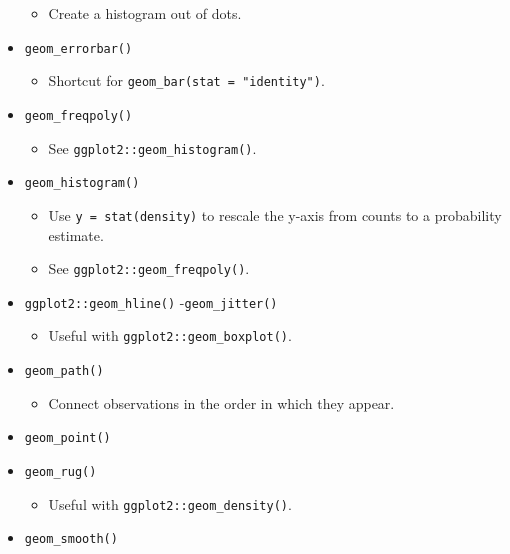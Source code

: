 \documentclass[
]{book}
\providecommand{\tightlist}{%
  \setlength{\itemsep}{0pt}\setlength{\parskip}{0pt}}
\begin{document}
\begin{itemize}
  \begin{itemize}
  \tightlist
  \item
    Create a histogram out of dots.
  \end{itemize}
\item
  \texttt{geom\_errorbar()}

  \begin{itemize}
  \tightlist
  \item
    Shortcut for \texttt{geom\_bar(stat\ =\ "identity")}.
  \end{itemize}
\item
  \texttt{geom\_freqpoly()}

  \begin{itemize}
  \tightlist
  \item
    See \texttt{ggplot2::geom\_histogram()}.
  \end{itemize}
\item
  \texttt{geom\_histogram()}

  \begin{itemize}
  \tightlist
  \item
    Use \texttt{y\ =\ stat(density)} to rescale the y-axis from counts to a probability estimate.
  \item
    See \texttt{ggplot2::geom\_freqpoly()}.
  \end{itemize}
\item
  \texttt{ggplot2::geom\_hline()}
  -\texttt{geom\_jitter()}

  \begin{itemize}
  \tightlist
  \item
    Useful with \texttt{ggplot2::geom\_boxplot()}.
  \end{itemize}
\item
  \texttt{geom\_path()}

  \begin{itemize}
  \tightlist
  \item
    Connect observations in the order in which they appear.
  \end{itemize}
\item
  \texttt{geom\_point()}
\item
  \texttt{geom\_rug()}

  \begin{itemize}
  \tightlist
  \item
    Useful with \texttt{ggplot2::geom\_density()}.
  \end{itemize}
\item
  \texttt{geom\_smooth()}


\end{itemize}
\end{document}
